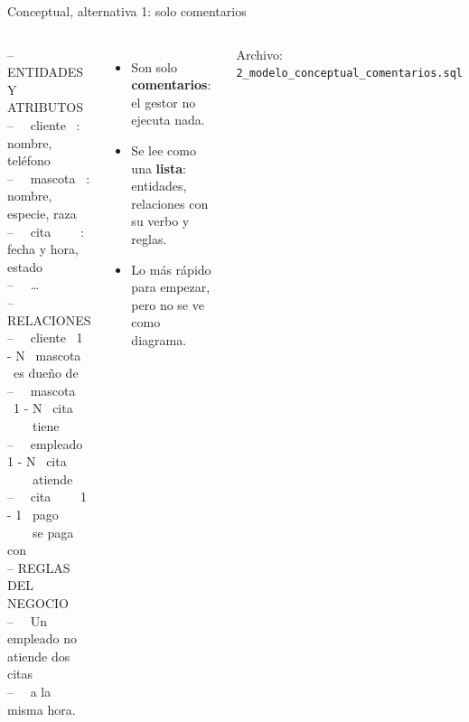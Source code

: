\documentclass[aspectratio=169,10pt,c]{beamer}
\newcommand{\com}[1]{\textcolor{utpGris}{-- #1}}
\newenvironment{sqlcode}[1][.86\textwidth]
  {\begin{center}\begin{lrbox}{\sqlbuf}\begin{minipage}{#1}\ttfamily\footnotesize\vspace{6pt}\raggedright}
  {\vspace{6pt}\end{minipage}\end{lrbox}\colorbox{utpGrisClaro}{\usebox{\sqlbuf}}\end{center}}
\begin{document}
\begin{frame}{Conceptual, alternativa 1: solo comentarios}
\begin{columns}[c,onlytextwidth]
\begin{sqlcode}[\dimexpr\textwidth-2\fboxsep\relax]
\scriptsize
\com{ENTIDADES Y ATRIBUTOS}\\
\com{\ \ cliente \ : nombre, teléfono}\\
\com{\ \ mascota \ : nombre, especie, raza}\\
\com{\ \ cita \ \ \ \ : fecha y hora, estado}\\
\com{\ \ \ldots}\\[4pt]
\com{RELACIONES}\\
\com{\ \ cliente \ 1 - N \ mascota \ es dueño de}\\
\com{\ \ mascota \ 1 - N \ cita \ \ \ \ tiene}\\
\com{\ \ empleado 1 - N \ cita \ \ \ \ atiende}\\
\com{\ \ cita \ \ \ \ 1 - 1 \ pago \ \ \ \ se paga con}\\[4pt]
\com{REGLAS DEL NEGOCIO}\\
\com{\ \ Un empleado no atiende dos citas}\\
\com{\ \ a la misma hora.}
\end{sqlcode}
\small
\begin{itemize}\setlength\itemsep{7pt}
  \item Son solo \textbf{comentarios}: el gestor no ejecuta nada.
  \item Se lee como una \textbf{lista}: entidades, relaciones con su verbo y reglas.
  \item Lo más rápido para empezar, pero no se ve como diagrama.
\end{itemize}
\vspace{0.15cm}
\footnotesize\color{utpGris} Archivo: \texttt{2\_modelo\_conceptual\_comentarios.sql}
\end{columns}
\end{frame}
\end{document}
